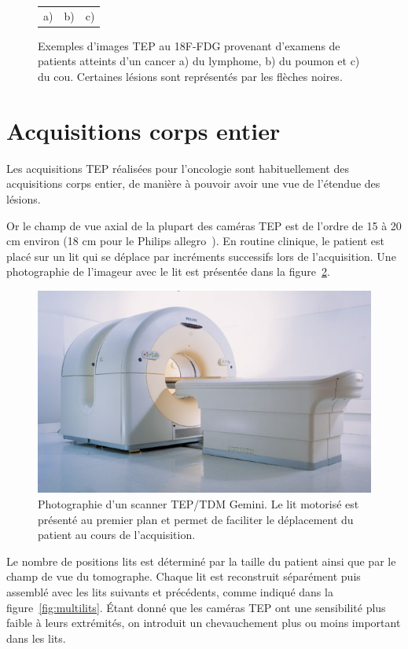 \begin{figure}[h!]
\begin{tabular}{c c c}
a) & b) & c)
\end{tabular}
\caption[Exemples d'images TEP]{Exemples d’images TEP au 18F-FDG provenant d’examens de patients atteints d’un cancer a) du lymphome, b) du poumon et c) du cou. Certaines lésions sont représentés par les flèches noires.}
\label{fig:exTEP}
\end{figure}

\section{Acquisitions corps entier}


Les acquisitions TEP réalisées pour l'oncologie sont habituellement des acquisitions corps entier, de manière à pouvoir avoir une vue de l'étendue des lésions.

Or le champ de vue axial de la plupart des caméras TEP est de l'ordre de 15 à 20 cm environ (18 cm pour le Philips allegro~\cite{lamare2006validation}). En routine clinique, le patient est placé sur un lit qui se déplace par incréments successifs lors de l'acquisition. Une photographie de l'imageur avec le lit est présentée dans la figure~\ref{fig:photoGemini}.

\begin{figure}
\centering
\includegraphics[width=12cm]{images/gemini}
\caption[Photographie d'un scanner TEP gemini]{Photographie d'un scanner TEP/TDM Gemini. Le lit motorisé est présenté au premier plan et permet de faciliter le déplacement du patient au cours de l'acquisition.}
\label{fig:photoGemini}
\end{figure}

Le nombre de positions lits est déterminé par la taille du patient ainsi que par le champ de vue du tomographe. Chaque lit est reconstruit séparément puis assemblé avec les lits suivants et précédents, comme indiqué dans la figure~\ref{fig:multilits}. \'Etant donné que les caméras TEP ont une sensibilité plus faible à leurs extrémités, on introduit un chevauchement plus ou moins important dans les lits.

